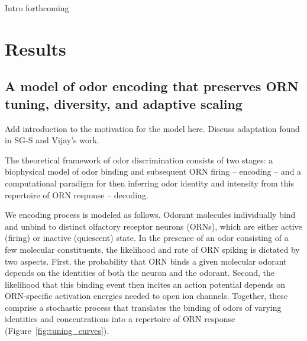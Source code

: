 
{\color{blue} Intro forthcoming}

\section{Results}

\subsection{A model of odor encoding that preserves ORN tuning, diversity, and adaptive scaling}

{\color{blue}Add introduction to the motivation for the model here. Discuss adaptation found in SG-S and Vijay's work.}


The theoretical framework of odor discrimination consists of two stages: a biophysical model of odor binding and subsequent ORN firing -- encoding -- and a computational paradigm for then inferring odor identity and intensity from this repertoire of ORN response -- decoding. 

We encoding process is modeled as follows. Odorant molecules individually bind and unbind to distinct olfactory receptor neurons (ORNs), which are either active (firing) or inactive (quiescent) state. In the presence of an odor consisting of a few molecular constituents, the likelihood and rate of ORN spiking is dictated by two aspects. First, the probability that ORN binds a given molecular odorant depends on the identities of both the neuron and the odorant. Second, the likelihood that this binding event then incites an action potential depends on ORN-specific activation energies needed to open ion channels. Together, these comprise a stochastic process that translates the binding of odors of varying identities and concentrations into a repertoire of ORN response (Figure~\ref{fig:tuning_curves}). 



